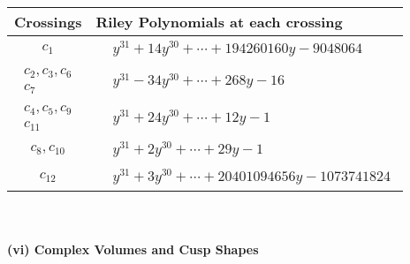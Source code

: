 \documentclass[1p]{elsarticle_modified}
\theoremstyle{definition}
\begin{document}
\begin{tabular}{m{50pt}|m{274pt}}
Crossings & \hspace{64pt}Riley Polynomials at each crossing \\
\hline $$\begin{aligned}c_{1}\end{aligned}$$&$\begin{aligned}
&y^{31}+14 y^{30}+\cdots+194260160 y-9048064
\end{aligned}$\\
\hline $$\begin{aligned}c_{2},c_{3},c_{6}\\c_{7}\end{aligned}$$&$\begin{aligned}
&y^{31}-34 y^{30}+\cdots+268 y-16
\end{aligned}$\\
\hline $$\begin{aligned}c_{4},c_{5},c_{9}\\c_{11}\end{aligned}$$&$\begin{aligned}
&y^{31}+24 y^{30}+\cdots+12 y-1
\end{aligned}$\\
\hline $$\begin{aligned}c_{8},c_{10}\end{aligned}$$&$\begin{aligned}
&y^{31}+2 y^{30}+\cdots+29 y-1
\end{aligned}$\\
\hline $$\begin{aligned}c_{12}\end{aligned}$$&$\begin{aligned}
&y^{31}+3 y^{30}+\cdots+20401094656 y-1073741824
\end{aligned}$\\
\hline
\end{tabular}\\~\\
\newpage\flushleft \textbf{(vi) Complex Volumes and Cusp Shapes}
\end{document}
